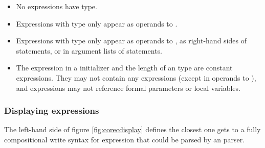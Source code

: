 \begin{docpart}
\begin{itemize}
\item No expressions have  type.
\item Expressions with  type only appear as
        operands to .
\item Expressions with  type only appear as
        operands to , as right-hand sides of
         statements, or in argument lists of
         statements.
\item The expression in a  initializer and the length
        of an  type are constant expressions. They may
        not contain any  expressions (except in operands to
        ), and  expressions
        may not reference formal parameters or local variables.
\end{itemize}

\subsubsection{Displaying expressions}

The left-hand side of figure \ref{fig:corecdisplay} defines the
closest one gets to a fully compositional write syntax
for \coreC expression that could be parsed by an \ansiC
parser.


\end{docpart}

